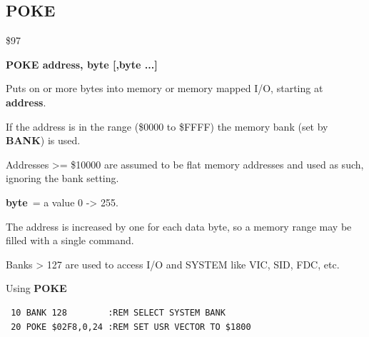 \subsection{POKE}
\begin{description}[leftmargin=2cm,style=nextline]
\item [Token:] \$97
\item [Format:] {\bf POKE address, byte [,byte ...] }
\item [Usage:]  Puts on or more bytes into memory
                or memory mapped I/O, starting at
                {\bf address}.

                If the address is in the range (\$0000 to \$FFFF) the
                memory bank (set by {\bf BANK}) is used.

                Addresses >= \$10000 are assumed to be flat memory
                addresses and used as such, ignoring the bank setting.

                {\bf byte} = a value 0 -> 255.

\item [Remarks:] The address is increased by one for each data byte,
                 so a memory range may be filled with a single command.

                 Banks > 127 are used to access I/O and SYSTEM
                 like VIC, SID, FDC, etc.
\item [Example:] Using {\bf POKE}

\begin{tcolorbox}[colback=black,coltext=white]
\verbatimfont{\codefont}
\begin{verbatim}
 10 BANK 128        :REM SELECT SYSTEM BANK
 20 POKE $02F8,0,24 :REM SET USR VECTOR TO $1800
\end{verbatim}
\end{tcolorbox}
\end{description}


\newpage
